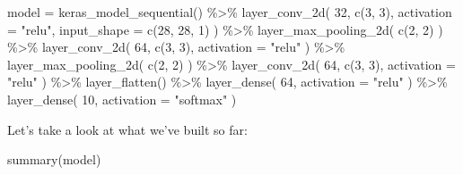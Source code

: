 \documentclass[
  a4paper,
]{article}
\newenvironment{Shaded}{\begin{snugshade}}{\end{snugshade}}
\newcommand{\AttributeTok}[1]{\textcolor[rgb]{0.77,0.63,0.00}{#1}}
\newcommand{\DecValTok}[1]{\textcolor[rgb]{0.00,0.00,0.81}{#1}}
\newcommand{\FunctionTok}[1]{\textcolor[rgb]{0.00,0.00,0.00}{#1}}
\newcommand{\NormalTok}[1]{#1}
\newcommand{\OtherTok}[1]{\textcolor[rgb]{0.56,0.35,0.01}{#1}}
\newcommand{\SpecialCharTok}[1]{\textcolor[rgb]{0.00,0.00,0.00}{#1}}
\newcommand{\StringTok}[1]{\textcolor[rgb]{0.31,0.60,0.02}{#1}}
\begin{document}
\begin{Shaded}
\begin{Highlighting}[]
\NormalTok{model }\OtherTok{=} \FunctionTok{keras\_model\_sequential}\NormalTok{() }\SpecialCharTok{\%\textgreater{}\%}
  \FunctionTok{layer\_conv\_2d}\NormalTok{(}
    \DecValTok{32}\NormalTok{, }\FunctionTok{c}\NormalTok{(}\DecValTok{3}\NormalTok{, }\DecValTok{3}\NormalTok{), }\AttributeTok{activation =} \StringTok{"relu"}\NormalTok{, }\AttributeTok{input\_shape =} \FunctionTok{c}\NormalTok{(}\DecValTok{28}\NormalTok{, }\DecValTok{28}\NormalTok{, }\DecValTok{1}\NormalTok{)}
\NormalTok{  ) }\SpecialCharTok{\%\textgreater{}\%}
  \FunctionTok{layer\_max\_pooling\_2d}\NormalTok{(}
    \FunctionTok{c}\NormalTok{(}\DecValTok{2}\NormalTok{, }\DecValTok{2}\NormalTok{)}
\NormalTok{  ) }\SpecialCharTok{\%\textgreater{}\%}
  \FunctionTok{layer\_conv\_2d}\NormalTok{(}
    \DecValTok{64}\NormalTok{, }\FunctionTok{c}\NormalTok{(}\DecValTok{3}\NormalTok{, }\DecValTok{3}\NormalTok{), }\AttributeTok{activation =} \StringTok{"relu"}
\NormalTok{  ) }\SpecialCharTok{\%\textgreater{}\%}
  \FunctionTok{layer\_max\_pooling\_2d}\NormalTok{(}
    \FunctionTok{c}\NormalTok{(}\DecValTok{2}\NormalTok{, }\DecValTok{2}\NormalTok{)}
\NormalTok{  ) }\SpecialCharTok{\%\textgreater{}\%}
  \FunctionTok{layer\_conv\_2d}\NormalTok{(}
    \DecValTok{64}\NormalTok{, }\FunctionTok{c}\NormalTok{(}\DecValTok{3}\NormalTok{, }\DecValTok{3}\NormalTok{), }\AttributeTok{activation =} \StringTok{"relu"}
\NormalTok{  ) }\SpecialCharTok{\%\textgreater{}\%}
  \FunctionTok{layer\_flatten}\NormalTok{() }\SpecialCharTok{\%\textgreater{}\%}
  \FunctionTok{layer\_dense}\NormalTok{(}
    \DecValTok{64}\NormalTok{, }\AttributeTok{activation =} \StringTok{"relu"}
\NormalTok{  ) }\SpecialCharTok{\%\textgreater{}\%}
  \FunctionTok{layer\_dense}\NormalTok{(}
    \DecValTok{10}\NormalTok{, }\AttributeTok{activation =} \StringTok{"softmax"}
\NormalTok{  )}
\end{Highlighting}
\end{Shaded}

Let's take a look at what we've built so far:

\begin{Shaded}
\begin{Highlighting}[]
\FunctionTok{summary}\NormalTok{(model)}
\end{Highlighting}
\end{Shaded}
\end{document}
